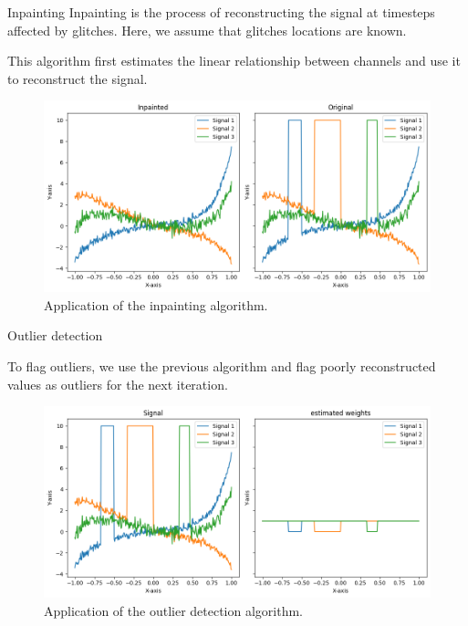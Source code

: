 \documentclass[10pt,serif]{beamer}
\begin{document}
\begin{frame}{Inpainting}
    Inpainting is the process of reconstructing the signal at timesteps affected by glitches. Here, we assume that glitches locations are known.

    This algorithm first estimates the linear relationship between channels and use it to reconstruct the signal.
    \begin{figure}
        \centering
        \includegraphics[width=.7\textwidth]{figures/inpaint.png}
        \caption{Application of the inpainting algorithm.}
        \label{fig:data}
    \end{figure}
\end{frame}

\begin{frame}{Outlier detection}

    To flag outliers, we use the previous algorithm and flag poorly reconstructed values as outliers for the next iteration.

    \begin{figure}
        \centering
        \includegraphics[width=.8\textwidth]{figures/outlier_detection.png}
        \caption{Application of the outlier detection algorithm.}
        \label{fig:data}
    \end{figure}

\end{frame}
\end{document}

